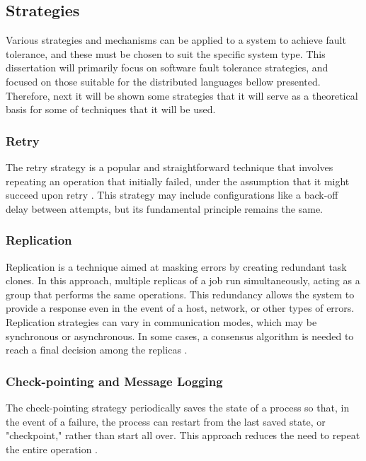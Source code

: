 \subsection{Strategies}

Various strategies and mechanisms can be applied to a system to achieve fault tolerance, and these must be chosen to suit the specific system type. This dissertation will primarily focus on software fault tolerance strategies, and focused on those suitable for the distributed languages bellow presented. Therefore, next it will be shown some strategies that it will serve as a theoretical basis for some of techniques that it will be used.

\subsubsection{Retry}

The retry strategy is a popular and straightforward technique that involves repeating an operation that initially failed, under the assumption that it might succeed upon retry \cite{Ledmi2018,Noor2019}. This strategy may include configurations like a back-off delay between attempts, but its fundamental principle remains the same.

\subsubsection{Replication}

Replication is a technique aimed at masking errors by creating redundant task clones. In this approach, multiple replicas of a job run simultaneously, acting as a group that performs the same operations. This redundancy allows the system to provide a response even in the event of a host, network, or other types of errors. Replication strategies can vary in communication modes, which may be synchronous or asynchronous. In some cases, a consensus algorithm is needed to reach a final decision among the replicas \cite{Isukapalli2024,Tanenbaum2023,Ledmi2018}.

\subsubsection{Check-pointing and Message Logging}

The check-pointing strategy periodically saves the state of a process so that, in the event of a failure, the process can restart from the last saved state, or "checkpoint," rather than start all over. This approach reduces the need to repeat the entire operation \cite{Isukapalli2024,Coulouris2012}.

